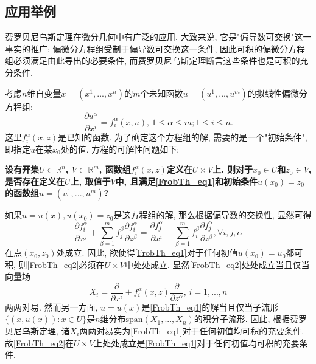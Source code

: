 \subsection{应用举例}
费罗贝尼乌斯定理在微分几何中有广泛的应用. 大致来说, 它是"偏导数可交换"这一事实的推广: 偏微分方程组受制于偏导数可交换这一条件, 因此可积的偏微分方程组必须满足由此导出的必要条件, 而费罗贝尼乌斯定理断言这些条件也是可积的充分条件.

考虑$n$维自变量$x=(x^1,...,x^n)$的$m$个未知函数$u=(u^1,...,u^m)$的拟线性偏微分方程组:
\begin{equation}\label{FrobTh_eq1}
\frac{\partial u^\alpha}{\partial x^i}=f_i^\alpha(x,u),\,1\leq\alpha\leq m;1\leq i\leq n.
\end{equation}
这里$f_i^\alpha(x,z)$是已知的函数. 为了确定这个方程组的解, 需要的是一个"初始条件", 即指定$u$在某$x_0$处的值. 方程的可解性问题如下:

\textbf{设有开集$U\subset\mathbb{R}^n$, $V\subset\mathbb{R}^m$, 函数组$f_i^\alpha(x,z)$定义在$U\times V$上. 则对于$x_0\in U$和$z_0\in V$, 是否存在定义在$U$上, 取值于$V$中, 且满足\autoref{FrobTh_eq1}和初始条件$u(x_0)=z_0$的函数组$u=(u^1,...,u^m)$?}

如果$u=u(x),u(x_0)=z_0$是这方程组的解, 那么根据偏导数的交换性, 显然可得
\begin{equation}\label{FrobTh_eq2}
\frac{\partial f_i^\alpha}{\partial x^j}+\sum_{\beta=1}^mf_j^\beta\frac{\partial f_i^\alpha}{\partial z^\beta}
=\frac{\partial f_j^\alpha}{\partial x^i}+\sum_{\beta=1}^mf_i^\beta\frac{\partial f_j^\alpha}{\partial z^\beta},\forall i,j,\alpha
\end{equation}
在点$(x_0,z_0)$处成立. 因此, 欲使得\autoref{FrobTh_eq1}对于任何初值$u(x_0)=u_0$都可积, 则\autoref{FrobTh_eq2}必须在$U\times V$中处处成立. 显然\autoref{FrobTh_eq2}处处成立当且仅当向量场
$$
X_i=\frac{\partial}{\partial x^i}+f_i^\alpha(x,z)\frac{\partial}{\partial z^\alpha},\,i=1,...,n
$$
两两对易. 然而另一方面, $u=u(x)$是\autoref{FrobTh_eq1}的解当且仅当子流形$\{(x,u(x)):x\in U\}$是$n$维分布$\text{span}(X_1,...,X_n)$的积分子流形. 因此, 根据费罗贝尼乌斯定理, 诸$X_i$两两对易实为\autoref{FrobTh_eq1}对于任何初值均可积的充要条件. 故\autoref{FrobTh_eq2}在$U\times V$上处处成立是\autoref{FrobTh_eq1}对于任何初值均可积的充要条件.